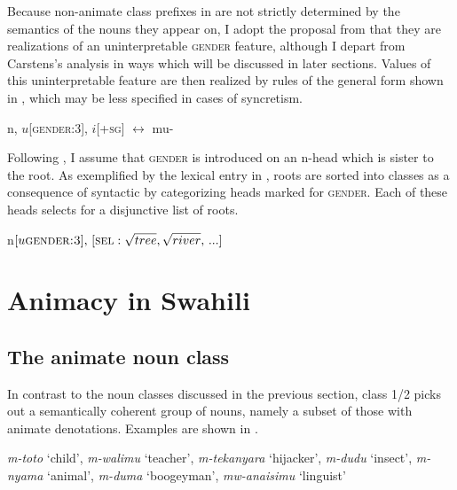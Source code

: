 \documentclass[output=paper,newtxmath,modfonts,nonflat,hidelinks]{langsci/langscibook}
\begin{document}
Because non-animate class prefixes in  are not strictly determined by the semantics of the nouns they appear on, I adopt the proposal from \citet{carstens91, carstens08} that they are realizations of an uninterpretable \textsc{gender} feature, although I depart from Carstens's analysis in ways which will be discussed in later sections. Values of this uninterpretable feature are then realized by rules of the general form shown in , which may be less specified in cases of syncretism. 

\ea\label{ex:pesetsky:moogender} \ea\label{ex:pesetsky:mooa}{ n, $u$[\textsc{gender:3}], $i$[\textsc{+sg}] $\longleftrightarrow$ mu-}
 \label{ex:pesetsky:oceanij}
 \z \z

Following \citet{kramer15}, I assume that \textsc{gender} is introduced on an n-head which is sister to the root. As exemplified by the lexical entry in , roots are sorted into classes as a consequence of syntactic  by categorizing heads marked for \textsc{gender}. Each of these heads selects for a disjunctive list of roots.

\ea\label{ex:pesetsky:rootsorting}{n$[u\textsc{gender:3}],\,[\textsc{sel}:\sqrt{tree}, \sqrt{river}, \, ...]$}   \z 


 \section{Animacy in Swahili} \label{sec:pesetsky:animacyinswahili}

\subsection{The animate noun class} \label{sec:pesetsky:animatesubsection}

In contrast to the noun classes discussed in the previous section, class 1/2 picks out a semantically coherent group of nouns, namely a subset of those with animate denotations. Examples are shown in .

\ea\label{ex:pesetsky:livingstuff}{ \textit{m-toto} `child', \textit{m-walimu} `teacher', \textit{m-tekanyara} `hijacker', \textit{m-dudu} `insect', \textit{m-nyama} `animal', \textit{m-duma} `boogeyman', \textit{mw-anaisimu} `linguist'} \z
\end{document}
